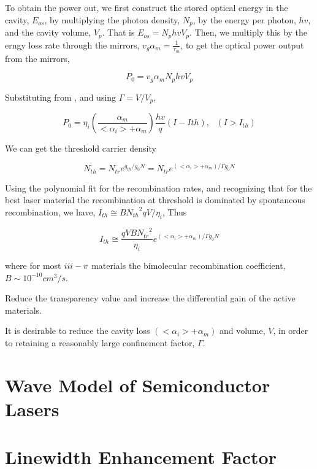 To obtain the power out, we first construct the stored optical energy in the
cavity, $E_{os}$, by multiplying the photon density, $N_p$, by the energy per
photon, $hv$, and the cavity volume, $V_p$. That is $E_{os} = N_phvV_p$. Then,
we multiply this by the erngy loss rate through the mirrors, $v_g\alpha_m =
\frac{1}{\tau_m}$, to get the optical power output from the mirrors,

\begin{equation}
  P_0 = v_g\alpha_{m}N_phvV_p
\end{equation}

Substituting from , and using $\Gamma = V/V_p$,

\begin{equation}
  P_0 = \eta_i(\frac{\alpha_m}{<\alpha_i> + \alpha_m})\frac{hv}{q}(I - I{th}),~~~(I > I_{th})
\end{equation}


We can get the threshold carrier density

\begin{equation}
  N_{th} = N_{tr}e^{g_{th}/g_{0}N} = N_{tr}e^{(<\alpha_i> + \alpha_m)/\Gamma{g_{0}}N}
\end{equation}

Using the polynomial fit for the recombination rates, and recognizing that for
the best laser material the recombination at threshold is dominated by
spontaneous recombination, we have, $I_{th}\cong B{N_{th}}^2qV/\eta_i$, Thus

\begin{equation}
  I_{th} {\cong} \frac{qVB{N_{tr}}^2}{\eta_i}e^{(<\alpha_i> + \alpha_m)/\Gamma{g_0}N}
\end{equation}

where for most $\uppercase\expandafter{\romannumeral3} -
\uppercase\expandafter{\romannumeral5}$ materials the bimolecular recombination
coefficient, $B \sim 10^{-10} cm^3/s$.

Reduce the transparency value and increase the differential gain of the active
materials.

It is desirable to reduce the cavity loss $(<\alpha_i> + \alpha_m)$ and volume,
$V$, in order to retaining a reasonably large confinement factor, $\Gamma$.

\section{Wave Model of Semiconductor Lasers} \label{corrections}

\section{Linewidth Enhancement Factor} \label{corrections}

